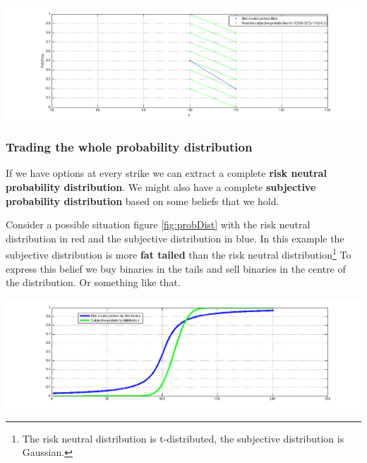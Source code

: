  \begin{center}
\includegraphics[width=6in]{pics/probRange}%
\label{fig:probRange}%
\end{center}


\subsubsection{Trading the whole probability distribution}

If we have options at every strike we can extract a complete \textbf{risk neutral probability distribution}. We might also have a complete \textbf{subjective probability distribution} based on some beliefs that we hold. 

Consider a possible situation figure \ref{fig:probDist} with the risk neutral distribution in red and the subjective distribution in blue. In this example the subjective distribution is more \textbf{fat tailed} than the risk neutral distribution\footnote{The risk neutral distribution is t-distributed, the subjective distribution is Gaussian.} To express this belief we buy binaries in the tails and sell binaries in the centre of the distribution. Or something like that.

 \begin{center}
\includegraphics[width=6in]{pics/probDist}%
\label{fig:probDist}%
\end{center}

